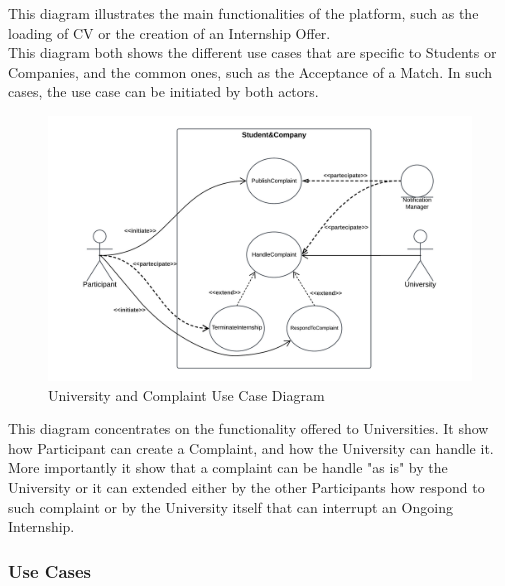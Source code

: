 This diagram illustrates the main functionalities of the platform, such as the loading of CV or the creation of an Internship Offer. \\
This diagram both shows the different use cases that are specific to Students or Companies, and the common ones, such as the Acceptance of a Match. In such cases, the use case can be initiated by both actors.
\clearpage
\begin{figure}[H]
    \centering
    \includegraphics[width=1 \textwidth]{Diagrams/UseDiagrams/UniversityUseCaseDiagram.png}
    \caption{University and Complaint Use Case Diagram}
    \label{fig:UniveristyUseCaseDiagram}
\end{figure}
This diagram concentrates on the functionality offered to Universities. It show how Participant can create a Complaint, and how the University can handle it. \\
More importantly it show that a complaint can be handle "as is" by the University or it can extended either by the other Participants how respond to such complaint or by the University itself that can interrupt an Ongoing Internship.
\clearpage

\subsubsection{Use Cases}

